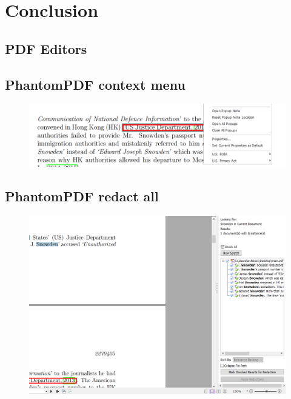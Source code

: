 \documentclass[\version]{l4proj}
\begin{document}
\chapter{Conclusion}



%
% 

\begin{appendices}
    \chapter{PDF Editors}
    \section{PhantomPDF context menu}\label{fig:foxit-menu}
    \begin{figure}[H]
        \centering
        \includegraphics[width=0.7\linewidth]{images/related_products/foxit_redaction.png}
    \end{figure}
    \section{PhantomPDF redact all}\label{fig:foxit-redact-all}
    \begin{figure}[H]
        \centering
        \includegraphics[width=0.7\linewidth]{images/related_products/foxit_redact_all.png}
    \end{figure}

\end{appendices}
\end{document}
